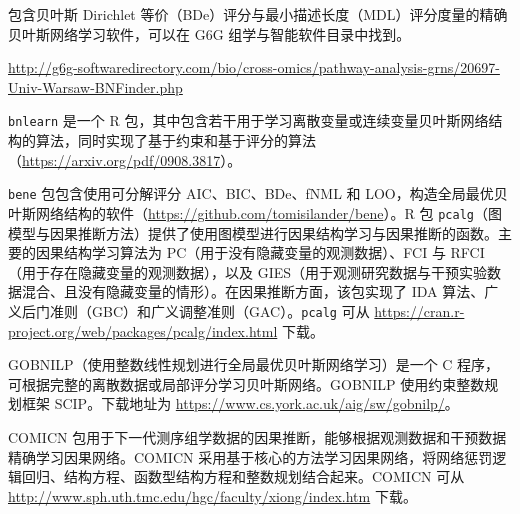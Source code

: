 包含贝叶斯 Dirichlet 等价（BDe）评分与最小描述长度（MDL）评分度量的精确贝叶斯网络学习软件，可以在 G6G 组学与智能软件目录中找到。
\begin{flushleft}\small
\url{http://g6g-softwaredirectory.com/bio/cross-omics/pathway-analysis-grns/20697-Univ-Warsaw-BNFinder.php}
\end{flushleft}
\texttt{bnlearn} 是一个 R 包，其中包含若干用于学习离散变量或连续变量贝叶斯网络结构的算法，同时实现了基于约束和基于评分的算法（\url{https://arxiv.org/pdf/0908.3817}）。

\texttt{bene} 包包含使用可分解评分 AIC、BIC、BDe、fNML 和 LOO，构造全局最优贝叶斯网络结构的软件（\url{https://github.com/tomisilander/bene}）。R 包 \texttt{pcalg}（图模型与因果推断方法）提供了使用图模型进行因果结构学习与因果推断的函数。主要的因果结构学习算法为 PC（用于没有隐藏变量的观测数据）、FCI 与 RFCI（用于存在隐藏变量的观测数据），以及 GIES（用于观测研究数据与干预实验数据混合、且没有隐藏变量的情形）。在因果推断方面，该包实现了 IDA 算法、广义后门准则（GBC）和广义调整准则（GAC）。\texttt{pcalg} 可从
\url{https://cran.r-project.org/web/packages/pcalg/index.html} 下载。

GOBNILP（使用整数线性规划进行全局最优贝叶斯网络学习）是一个 C 程序，可根据完整的离散数据或局部评分学习贝叶斯网络。GOBNILP 使用约束整数规划框架 SCIP。下载地址为
\url{https://www.cs.york.ac.uk/aig/sw/gobnilp/}。

COMICN 包用于下一代测序组学数据的因果推断，能够根据观测数据和干预数据精确学习因果网络。COMICN 采用基于核心的方法学习因果网络，将网络惩罚逻辑回归、结构方程、函数型结构方程和整数规划结合起来。COMICN 可从
\url{http://www.sph.uth.tmc.edu/hgc/faculty/xiong/index.htm} 下载。

